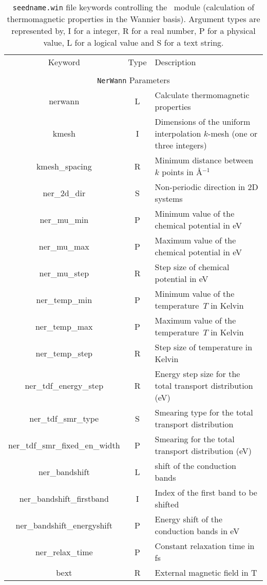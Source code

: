 \begin{table}[h!]
\begin{center}
\begin{tabular}{|c|c|p{6cm}|}
\hline
Keyword & Type & Description \\
        &      &             \\
\hline\hline
\multicolumn{3}{|c|}{{\tt NerWann} Parameters} \\
\hline
{\sc nerwann}   & L & Calculate thermomagnetic properties \\
{\sc [ner\_]kmesh} & I & Dimensions of the uniform interpolation 
$k$-mesh (one or three integers)\\ 
{\sc [ner\_]kmesh\_spacing} & R & Minimum distance between $k$ points in \AA$^{-1}$\\
{\sc ner\_2d\_dir} & S & Non-periodic direction in 2D systems\\
{\sc ner\_mu\_min} & P & Minimum value of the chemical potential in eV\\
{\sc ner\_mu\_max} & P & Maximum value of the chemical potential in eV\\
{\sc ner\_mu\_step} & R & Step size of chemical potential in eV\\
{\sc ner\_temp\_min} & P & Minimum value of the temperature~$T$ in Kelvin \\
{\sc ner\_temp\_max} & P & Maximum value of the temperature~$T$ in Kelvin \\
{\sc ner\_temp\_step} & R & Step size of temperature in Kelvin \\
{\sc ner\_tdf\_energy\_step} & R & Energy step size for the total transport distribution (eV) \\
{\sc ner\_tdf\_smr\_type} & S & Smearing type for the total transport distribution \\
{\sc ner\_tdf\_smr\_fixed\_en\_width} & P & Smearing for the total transport distribution (eV) \\
{\sc ner\_bandshift} & L & shift of the conduction bands\\
{\sc ner\_bandshift\_firstband} & I & Index of the first band to be shifted\\
{\sc ner\_bandshift\_energyshift} & P & Energy shift of the conduction bands in eV\\
{\sc ner\_relax\_time} & P & Constant relaxation time in fs\\
{\sc bext} & R & External magnetic field in T\\
\hline
\end{tabular}
\caption[Parameter file keywords controlling the \nw\ module.]
{{\tt seedname.win} file keywords controlling the \nw\ module (calculation of thermomagnetic properties in the Wannier basis). Argument types
are represented by, I for a integer, R for a real number, P for a
physical value, L for a logical value and S for a text string.}
\label{parameter_keywords_bw}
\end{center}
\end{table}

